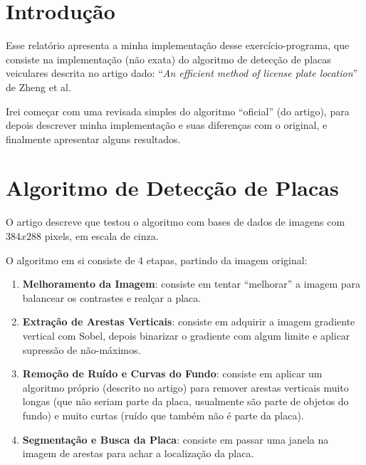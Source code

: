 




\cabecalho

\section{Introdução}
Esse relatório apresenta a minha implementação desse exercício-programa, que
consiste na implementação (não exata) do algoritmo de detecção de placas veiculares
descrita no artigo dado: ``\textit{An efficient method of license plate location}'' de Zheng et al.

Irei começar com uma revisada simples do algoritmo ``oficial'' (do artigo), para depois descrever
minha implementação e suas diferenças com o original, e finalmente apresentar alguns resultados.

\section{Algoritmo de Detecção de Placas}
O artigo descreve que testou o algoritmo com bases de dados de imagens com $384 x 288$ pixels, em
escala de cinza. 

O algoritmo em si consiste de 4 etapas, partindo da imagem original:
\begin{enumerate}
  \item \textbf{Melhoramento da Imagem}: consiste em tentar ``melhorar'' a imagem para balancear
    os contrastes e realçar a placa.
  \item \textbf{Extração de Arestas Verticais}: consiste em adquirir a imagem gradiente vertical
    com Sobel, depois binarizar o gradiente com algum limite e aplicar supressão de não-máximos.    
  \item \textbf{Remoção de Ruído e Curvas do Fundo}: consiste em aplicar um algoritmo próprio
    (descrito no artigo) para remover arestas verticais muito longas (que não seriam parte da placa,
    usualmente são parte de objetos do fundo) e muito curtas (ruído que também não é parte da placa).
  \item \textbf{Segmentação e Busca da Placa}: consiste em passar uma janela na imagem de arestas 
    para achar a localização da placa.
\end{enumerate}


